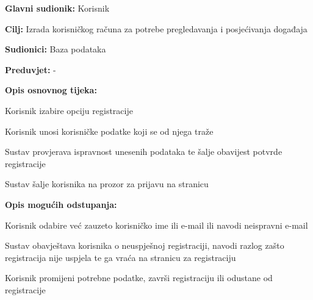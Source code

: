 					\noindent {}
					\begin{packed_item}
					\item \textbf{Glavni sudionik:} Korisnik
					\item  \textbf{Cilj:} Izrada korisničkog računa za potrebe pregledavanja i posjećivanja događaja
					\item  \textbf{Sudionici:} Baza podataka
					\item  \textbf{Preduvjet:} -
					\item  \textbf{Opis osnovnog tijeka:}
					
					\item[] \begin{packed_enum}
						
						\item Korisnik izabire opciju registracije
						\item Korisnik unosi korisničke podatke koji se od njega traže
						\item Sustav provjerava ispravnost unesenih podataka te šalje obavijest potvrde registracije
						\item Sustav šalje korisnika na prozor za prijavu na stranicu
					\end{packed_enum}
					
											\item  \textbf{Opis mogućih odstupanja:}
					
					\item[] \begin{packed_item}
						
						\item[2.a] Korisnik odabire već zauzeto korisničko ime ili e-mail ili navodi neispravni e-mail
						\item[] \begin{packed_enum}
							
							\item Sustav obavještava korisnika o neuspješnoj registraciji, navodi razlog zašto
							registracija nije uspjela te ga vraća na stranicu za registraciju
							\item Korisnik promijeni potrebne podatke, završi registraciju ili odustane od registracije
							
						\end{packed_enum}
					\end{packed_item}

				\end{packed_item}
				
